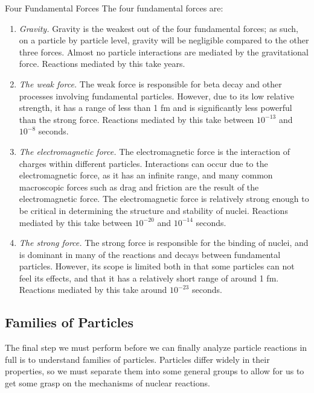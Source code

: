 \documentclass{article}
\begin{document}
\begin{defi}{Four Fundamental Forces}
    The four fundamental forces are:
    \begin{enumerate}
        \item \textit{Gravity.} Gravity is the weakest out of the four fundamental forces; as such, on a particle by particle level, gravity will be negligible compared to the other three forces. Almost no particle interactions are mediated by the gravitational force. Reactions mediated by this take years. 
        \item \textit{The weak force.} The weak force is responsible for beta decay and other processes involving fundamental particles. However, due to its low relative strength, it has a range of less than 1 fm and is significantly less powerful than the strong force. Reactions mediated by this take between $10^{-13}$ and $10^{-8}$ seconds.
        \item \textit{The electromagnetic force.} The electromagnetic force is the interaction of charges within different particles. Interactions can occur due to the electromagnetic force, as it has an infinite range, and many common macroscopic forces such as drag and friction are the result of the electromagnetic force. The electromagnetic force is relatively strong enough to be critical in determining the structure and stability of nuclei. Reactions mediated by this take between $10^{-20}$ and $10^{-14}$ seconds. 
        \item \textit{The strong force.} The strong force is responsible for the binding of nuclei, and is dominant in many of the reactions and decays between fundamental particles. However, its scope is limited both in that some particles can not feel its effects, and that it has a relatively short range of around 1 fm. Reactions mediated by this take around $10^{-23}$ seconds.
    \end{enumerate}
\end{defi}

\subsection{Families of Particles}

The final step we must perform before we can finally analyze particle reactions in full is to understand families of particles. Particles differ widely in their properties, so we must separate them into some general groups to allow for us to get some grasp on the mechanisms of nuclear reactions. 
\end{document}
